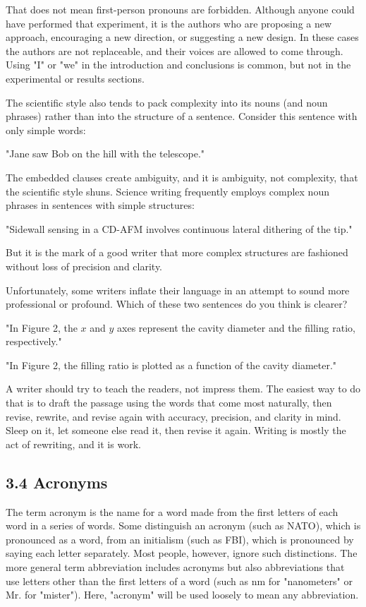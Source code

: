 That does not mean first-person pronouns are forbidden. Although anyone could have performed that experiment, it is the authors who are proposing a new approach, encouraging a new direction, or suggesting a new design. In these cases the authors are not replaceable, and their voices are allowed to come through. Using "I" or "we" in the introduction and conclusions is common, but not in the experimental or results sections.

The scientific style also tends to pack complexity into its nouns (and noun phrases) rather than into the structure of a sentence. Consider this sentence with only simple words:

"Jane saw Bob on the hill with the telescope."

The embedded clauses create ambiguity, and it is ambiguity, not complexity, that the scientific style shuns. Science writing frequently employs complex noun phrases in sentences with simple structures:

"Sidewall sensing in a CD-AFM involves continuous lateral dithering of the tip."

But it is the mark of a good writer that more complex structures are fashioned without loss of precision and clarity.

Unfortunately, some writers inflate their language in an attempt to sound more professional or profound. Which of these two sentences do you think is clearer?

"In Figure 2, the $x$ and $y$ axes represent the cavity diameter and the filling ratio, respectively."

"In Figure 2, the filling ratio is plotted as a function of the cavity diameter."

A writer should try to teach the readers, not impress them. The easiest way to do that is to draft the passage using the words that come most naturally, then revise, rewrite, and revise again with accuracy, precision, and clarity in mind. Sleep on it, let someone else read it, then revise it again. Writing is mostly the act of rewriting, and it is work.

\subsection*{3.4 Acronyms}
The term acronym is the name for a word made from the first letters of each word in a series of words. Some distinguish an acronym (such as NATO), which is pronounced as a word, from an initialism (such as FBI), which is pronounced by saying each letter separately. Most people, however, ignore such distinctions. The more general term abbreviation includes acronyms but also abbreviations that use letters other than the first letters of a word (such as nm for "nanometers" or Mr. for "mister"). Here, "acronym" will be used loosely to mean any abbreviation.

